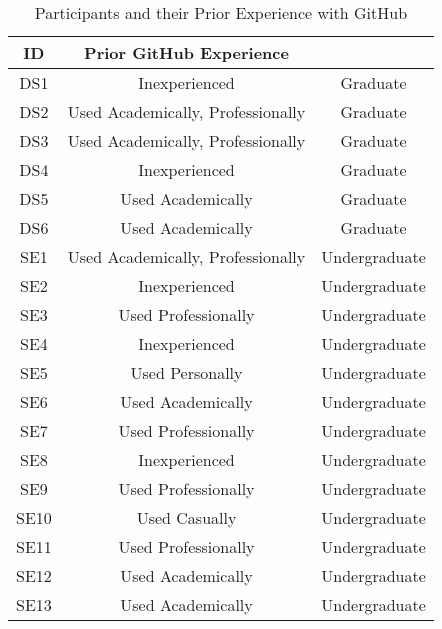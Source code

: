 \begin{table}[h]
    \vspace{1pt}
        \caption{Participants and their Prior Experience with GitHub}\label{table:interviews:students}
    \vspace{1pt}
    \begin{center}
        \begin{tabular}{c | c | c}
            \hline
            ID & Prior GitHub Experience \\
            \hline
            DS1 & Inexperienced & Graduate \\ \hline
            DS2 & Used Academically, Professionally & Graduate \\ \hline
            DS3 & Used Academically, Professionally & Graduate \\ \hline
            DS4 & Inexperienced & Graduate \\ \hline
            DS5 & Used Academically & Graduate \\ \hline
            DS6 & Used Academically & Graduate \\ \hline
            SE1 & Used Academically, Professionally & Undergraduate \\ \hline
            SE2 & Inexperienced & Undergraduate \\ \hline
            SE3 & Used Professionally & Undergraduate \\ \hline
            SE4 & Inexperienced & Undergraduate \\ \hline
            SE5 & Used Personally & Undergraduate \\ \hline
            SE6 & Used Academically & Undergraduate \\ \hline
            SE7 & Used Professionally & Undergraduate \\ \hline
            SE8 & Inexperienced & Undergraduate \\ \hline
            SE9 & Used Professionally & Undergraduate \\ \hline
            SE10 & Used Casually & Undergraduate \\ \hline
            SE11 & Used Professionally & Undergraduate \\ \hline
            SE12 & Used Academically & Undergraduate \\ \hline
            SE13 & Used Academically & Undergraduate \\ \hline
        \end{tabular}
    \end{center}
\end{table}


